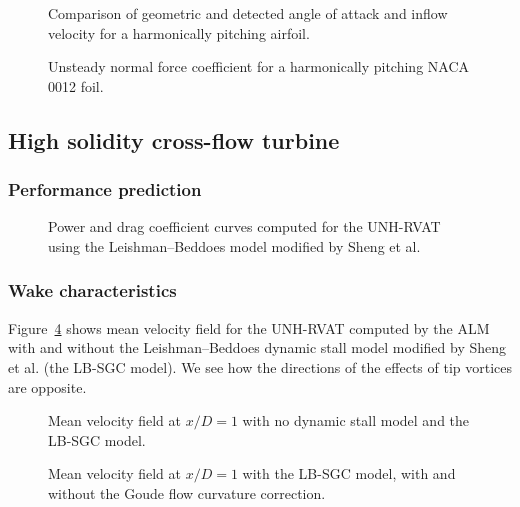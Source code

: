 \begin{figure}
    \caption{Comparison of geometric and detected angle of attack and inflow
        velocity for a harmonically pitching airfoil.}
    
    \label{fig:pitching-alpha-U_rel}
\end{figure}

\begin{figure}
    \caption{Unsteady normal force coefficient for a harmonically pitching NACA
        0012 foil.}
    
    \label{fig:pitching-cn}
\end{figure}


\subsection{High solidity cross-flow turbine}


\subsubsection{Performance prediction}

\begin{figure}
    \caption{Power and drag coefficient curves computed for the UNH-RVAT using
        the Leishman--Beddoes model modified by Sheng et al.}
    
    \label{fig:RVAT-ALM-perf-curves}
\end{figure}


\subsubsection{Wake characteristics}

Figure~\ref{fig:RVAT-ALM-meancontquiv-DS} shows mean velocity field for the
UNH-RVAT computed by the ALM with and without the Leishman--Beddoes dynamic
stall model modified by Sheng et al. (the LB-SGC model). We see how the
directions of the effects of tip vortices are opposite.

\begin{figure}
    \caption{Mean velocity field at $x/D=1$ with no dynamic stall model and the
        LB-SGC model.}
    
    \label{fig:RVAT-ALM-meancontquiv-DS}
\end{figure}

\begin{figure}
    \caption{Mean velocity field at $x/D=1$ with the LB-SGC model, with and
        without the Goude flow curvature correction.}
    
    \label{fig:RVAT-ALM-flow-curvature}
\end{figure}

